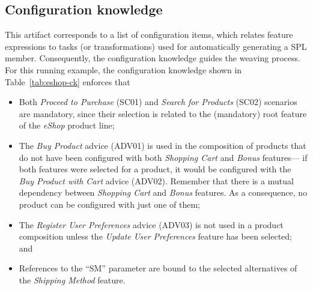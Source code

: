 \subsection{Configuration knowledge}\label{sub:configuration-knowledge}

This artifact corresponds to a list of configuration items, which
relates feature expressions to tasks (or transformations) used for automatically generating a
SPL member. Consequently, the configuration knowledge guides the weaving
process. For this running example, the configuration knowledge shown in
Table~\ref{tab:eshop-ck} enforces that

\begin{itemize}
\item Both \emph{Proceed to Purchase} (SC01) and \emph{Search for Products}
(SC02) scenarios are mandatory, since their selection is related to the
(mandatory) root feature of the \emph{eShop} product line;

\item The \emph{Buy Product} advice (ADV01) is used in the composition of
products that do not have been configured with both \emph{Shopping Cart} and \emph{Bonus}
features--- if both features were selected for a product, it would be configured
with the \emph{Buy Product with Cart} advice (ADV02). Remember that there is a
mutual dependency between \emph{Shopping Cart} and \emph{Bonus} features. As a
consequence, no product can be configured with just one of them;

\item The \emph{Register User Preferences} advice (ADV03) is not used in a
product composition unless the \emph{Update User Preferences} feature has been
selected; and

\item References to the ``SM'' parameter are bound to the
selected alternatives of the \emph{Shipping Method} feature.

\end{itemize}

